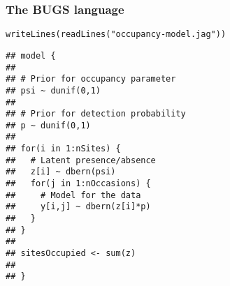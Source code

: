 \documentclass[color=usenames,dvipsnames]{beamer}\usepackage[]{graphicx}\usepackage[]{color}
\makeatletter
\newcommand{\hlstr}[1]{\textcolor[rgb]{0.749,0.012,0.012}{#1}}%
\newcommand{\hlstd}[1]{\textcolor[rgb]{0,0,0}{#1}}%
\newcommand{\hlkwd}[1]{\textcolor[rgb]{0.004,0.004,0.506}{#1}}%
\newenvironment{kframe}{%
 \def\at@end@of@kframe{}%
 \ifinner\ifhmode%
  \def\at@end@of@kframe{\end{minipage}}%
  \begin{minipage}{\columnwidth}%
 \fi\fi%
 \def\FrameCommand##1{\hskip\@totalleftmargin \hskip-\fboxsep
 \colorbox{shadecolor}{##1}\hskip-\fboxsep
     \hskip-\linewidth \hskip-\@totalleftmargin \hskip\columnwidth}%
 \MakeFramed {\advance\hsize-\width
   \@totalleftmargin\z@ \linewidth\hsize
   \@setminipage}}%
 {\par\unskip\endMakeFramed%
 \at@end@of@kframe}
\newenvironment{knitrout}{}{} %
\makeatother
\begin{document}
\begin{frame}[fragile]
  \frametitle{The BUGS language}
\begin{knitrout}\scriptsize
{}\color{fgcolor}\begin{kframe}
\begin{alltt}
\hlkwd{writeLines}\hlstd{(}\hlkwd{readLines}\hlstd{(}\hlstr{"occupancy-model.jag"}\hlstd{))}
\end{alltt}
\begin{verbatim}
## model {
## 
## # Prior for occupancy parameter
## psi ~ dunif(0,1)
## 
## # Prior for detection probability
## p ~ dunif(0,1)
## 
## for(i in 1:nSites) {
##   # Latent presence/absence
##   z[i] ~ dbern(psi)   
##   for(j in 1:nOccasions) {
##     # Model for the data
##     y[i,j] ~ dbern(z[i]*p)
##   }
## }
## 
## sitesOccupied <- sum(z)
## 
## }
\end{verbatim}
\end{kframe}
\end{knitrout}
\end{frame}










\end{document}
